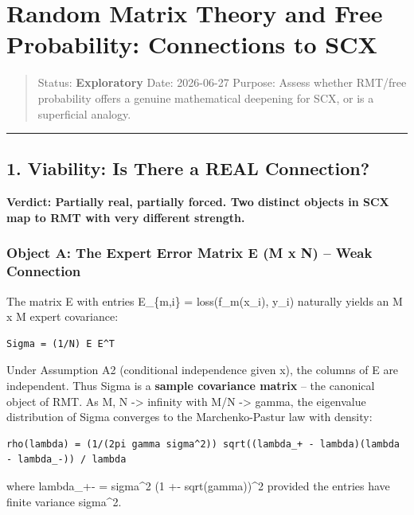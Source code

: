 \documentclass[
  12pt,
]{article}
\author{SCX}
\date{2026}
\begin{document}
\section{Random Matrix Theory and Free Probability: Connections to
SCX}\label{random-matrix-theory-and-free-probability-connections-to-scx}

\begin{quote}
Status: \textbf{Exploratory} \textbar{} Date: 2026-06-27 Purpose: Assess
whether RMT/free probability offers a genuine mathematical deepening for
SCX, or is a superficial analogy.
\end{quote}

\begin{center}\rule{0.5\linewidth}{0.5pt}\end{center}

\subsection{1. Viability: Is There a REAL
Connection?}\label{viability-is-there-a-real-connection}

\textbf{Verdict: Partially real, partially forced. Two distinct objects
in SCX map to RMT with very different strength.}

\subsubsection{Object A: The Expert Error Matrix E (M x N) -- Weak
Connection}\label{object-a-the-expert-error-matrix-e-m-x-n-weak-connection}

The matrix E with entries E\_\{m,i\} = loss(f\_m(x\_i), y\_i) naturally
yields an M x M expert covariance:

\begin{verbatim}
Sigma = (1/N) E E^T
\end{verbatim}

Under Assumption A2 (conditional independence given x), the columns of E
are independent. Thus Sigma is a \textbf{sample covariance matrix} --
the canonical object of RMT. As M, N -\textgreater{} infinity with M/N
-\textgreater{} gamma, the eigenvalue distribution of Sigma converges to
the Marchenko-Pastur law with density:

\begin{verbatim}
rho(lambda) = (1/(2pi gamma sigma^2)) sqrt((lambda_+ - lambda)(lambda - lambda_-)) / lambda
\end{verbatim}

where lambda\_+- = sigma\^{}2 (1 +- sqrt(gamma))\^{}2 provided the
entries have finite variance sigma\^{}2.
\end{document}
